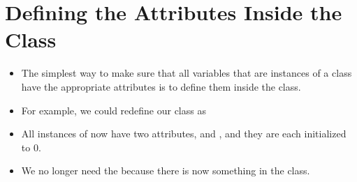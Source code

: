 \documentclass[letterpaper,10pt,english]{sphinxmanual}
\begin{document}
\section{Defining the Attributes Inside the Class}
\label{\detokenize{lecture_notes/lec18_classes1:defining-the-attributes-inside-the-class}}\begin{itemize}
\item {} 
The simplest way to make sure that all variables that are instances
of a class have the appropriate attributes is to define them inside
the class.

\item {} 
For example, we could redefine our class as

%
\begin{sphinxVerbatim}[commandchars=\\\{\}]
 
      
      
\end{sphinxVerbatim}

\item {} 
All instances of  now have two attributes,  and
, and they are each initialized to 0.

\item {} 
We no longer need the  because there is now something in the
class.

\end{itemize}
\end{document}
